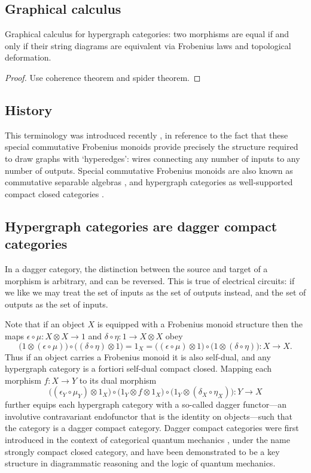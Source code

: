 \subsection{Graphical calculus}
\begin{proposition}
  Graphical calculus for hypergraph categories: two morphisms are equal if and
  only if their string diagrams are equivalent via Frobenius laws and
  topological deformation.
\end{proposition}
\begin{proof}
  Use coherence theorem and spider theorem.
\end{proof}

\subsection{History}
This terminology was introduced recently \cite{Ki}, in reference to the fact
that these special commutative Frobenius monoids provide precisely the structure
required to draw graphs with `hyperedges': wires connecting any number of
inputs to any number of outputs. Special commutative Frobenius monoids are also
known as commutative separable algebras \cite{RSW}, and hypergraph categories as
well-supported compact closed categories \cite{Ca}.


\subsection{Hypergraph categories are dagger compact categories} \label{subsec:dagger}

In a dagger category, the distinction between the source and target of a morphism is arbitrary, and can be reversed. This is true of electrical circuits: if we like we may treat the set of inputs as the set of outputs instead, and the set of outputs as the set of inputs.

Note that if an object $X$ is equipped with a Frobenius monoid structure then
the maps $\epsilon \circ \mu\colon  X \otimes X \longrightarrow 1$ and $\delta \circ
\eta\colon  1 \longrightarrow X \otimes X$ obey 
\[
  \big(1 \otimes (\epsilon \circ \mu)\big) \circ \big((\delta \circ \eta)
  \otimes 1\big) = 1_X = \big((\epsilon \circ \mu) \otimes 1\big) \circ \big(1
  \otimes (\delta \circ \eta)\big)\colon X \longrightarrow X.
\]
Thus if an object carries a Frobenius monoid it is also self-dual, and any
hypergraph category is a fortiori self-dual compact closed. Mapping each
morphism $f\colon  X \to Y$ to its dual morphism
\[
  \big((\epsilon_Y \circ \mu_Y) \otimes 1_X\big) \circ \big( 1_Y \otimes f
  \otimes 1_X \big) \circ \big(1_Y \otimes (\delta_X \circ \eta_X)\big)\colon  Y
  \longrightarrow X
\]
further equips each hypergraph category with a so-called dagger functor---an
involutive contravariant endofunctor that is the identity on objects---such that
the category is a dagger compact category. Dagger compact categories were first
introduced in the context of categorical quantum mechanics \cite{AC}, under the
name strongly compact closed category, and have been demonstrated to be a key
structure in diagrammatic reasoning and the logic of quantum mechanics.

